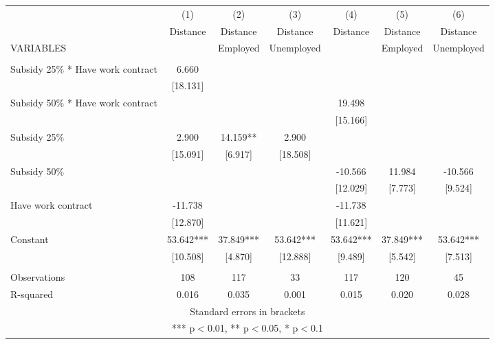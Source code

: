 \begin{tabular}{lcccccc} \hline
 & (1) & (2) & (3) & (4) & (5) & (6) \\
 & Distance & Distance & Distance & Distance & Distance & Distance \\
VARIABLES &  & Employed & Unemployed &  & Employed & Unemployed \\ \hline
 &  &  &  &  &  &  \\
Subsidy 25\% * Have work contract & 6.660 &  &  &  &  &  \\
 & [18.131] &  &  &  &  &  \\
Subsidy 50\% * Have work contract &  &  &  & 19.498 &  &  \\
 &  &  &  & [15.166] &  &  \\
Subsidy 25\% & 2.900 & 14.159** & 2.900 &  &  &  \\
 & [15.091] & [6.917] & [18.508] &  &  &  \\
Subsidy 50\% &  &  &  & -10.566 & 11.984 & -10.566 \\
 &  &  &  & [12.029] & [7.773] & [9.524] \\
Have work contract & -11.738 &  &  & -11.738 &  &  \\
 & [12.870] &  &  & [11.621] &  &  \\
Constant & 53.642*** & 37.849*** & 53.642*** & 53.642*** & 37.849*** & 53.642*** \\
 & [10.508] & [4.870] & [12.888] & [9.489] & [5.542] & [7.513] \\
 &  &  &  &  &  &  \\
Observations & 108 & 117 & 33 & 117 & 120 & 45 \\
 R-squared & 0.016 & 0.035 & 0.001 & 0.015 & 0.020 & 0.028 \\ \hline
\multicolumn{7}{c}{ Standard errors in brackets} \\
\multicolumn{7}{c}{ *** p$<$0.01, ** p$<$0.05, * p$<$0.1} \\
\end{tabular}
